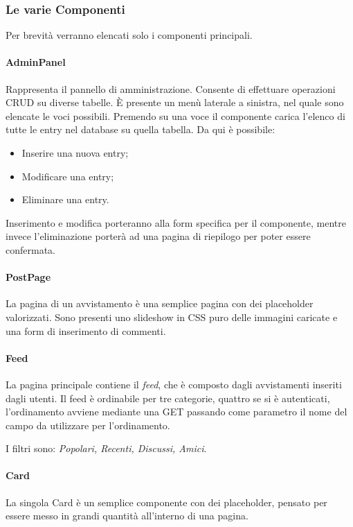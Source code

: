 \documentclass[12pt, a4paper]{article}
\begin{document}
    \subsubsection{Le varie Componenti}
    Per brevità verranno elencati solo i componenti principali.

    \paragraph{AdminPanel} Rappresenta il pannello di amministrazione. Consente di effettuare operazioni CRUD su diverse tabelle. È presente un menù laterale a sinistra, nel quale sono elencate le voci possibili. Premendo su una voce il componente carica l'elenco di tutte le entry nel database su quella tabella. Da qui è possibile:
    \begin{itemize}
        \item Inserire una nuova entry;
        \item Modificare una entry;
        \item Eliminare una entry.
    \end{itemize}
    Inserimento e modifica porteranno alla form specifica per il componente, mentre invece l'eliminazione porterà ad una pagina di riepilogo per poter essere confermata.

    \paragraph{PostPage}
    La pagina di un avvistamento è una semplice pagina con dei placeholder valorizzati. Sono presenti uno slideshow in CSS puro delle immagini caricate e una form di inserimento di commenti.

    \paragraph{Feed}
    La pagina principale contiene il \textit{feed}, che è composto dagli avvistamenti inseriti dagli utenti.
    Il feed è ordinabile per tre categorie, quattro se si è autenticati,  l'ordinamento avviene mediante una GET passando
    come parametro il nome del campo da utilizzare per l'ordinamento.

    I filtri sono: \emph{Popolari, Recenti, Discussi, Amici}.

    \paragraph{Card}
    La singola Card è un semplice componente con dei placeholder, pensato per essere messo in grandi quantità all'interno di una pagina.
\end{document}
